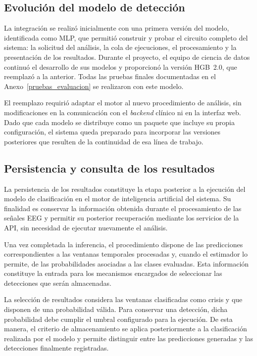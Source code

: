 \subsection{Evolución del modelo de detección}
\label{subsec:evolucion-modelo}

La integración se realizó inicialmente con una primera versión del modelo, identificada como MLP, que permitió construir y probar el circuito completo del sistema: la solicitud del análisis, la cola de ejecuciones, el procesamiento y la presentación de los resultados.
Durante el proyecto, el equipo de ciencia de datos continuó el desarrollo de sus modelos y proporcionó la versión HGB~2.0, que reemplazó a la anterior.
Todas las pruebas finales documentadas en el Anexo~\ref{pruebas_evaluacion} se realizaron con este modelo.

El reemplazo requirió adaptar el motor al nuevo procedimiento de análisis, sin modificaciones en la comunicación con el \textit{backend} clínico ni en la interfaz web.
Dado que cada modelo se distribuye como un paquete que incluye su propia configuración, el sistema queda preparado para incorporar las versiones posteriores que resulten de la continuidad de esa línea de trabajo.

\subsection{Persistencia y consulta de los resultados}

La persistencia de los resultados constituye la etapa posterior a la
ejecución del modelo de clasificación en el motor de inteligencia
artificial del sistema. Su finalidad es conservar la información
obtenida durante el procesamiento de las señales EEG y permitir
su posterior recuperación mediante los servicios de la API,
sin necesidad de ejecutar nuevamente el análisis.

Una vez completada la inferencia, el procedimiento dispone de
las predicciones correspondientes a las ventanas temporales
procesadas y, cuando el estimador lo permite, de las probabilidades
asociadas a las clases evaluadas. Esta información constituye
la entrada para los mecanismos encargados de seleccionar
las detecciones que serán almacenadas.

La selección de resultados considera las ventanas clasificadas
como crisis y que disponen de una probabilidad válida. Para
conservar una detección, dicha probabilidad debe cumplir el
umbral configurado para la ejecución. De esta manera, el
criterio de almacenamiento se aplica posteriormente a la
clasificación realizada por el modelo y permite distinguir
entre las predicciones generadas y las detecciones finalmente
registradas.

